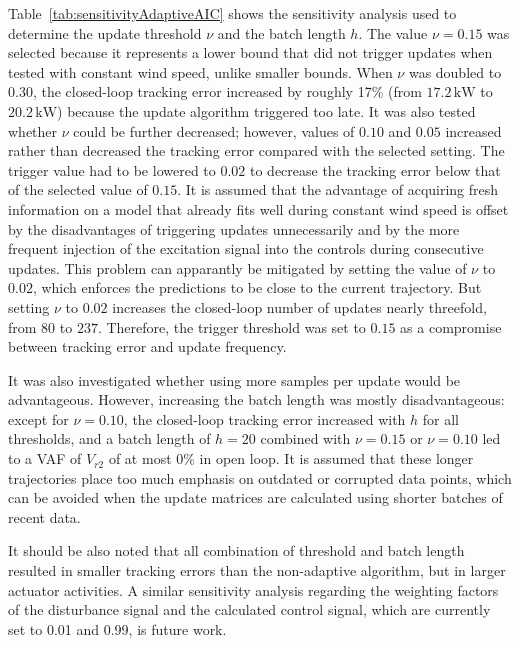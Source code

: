 Table~\ref{tab:sensitivityAdaptiveAIC} shows the sensitivity analysis used to determine the update threshold $\nu$ and the batch length $h$. The value $\nu = 0.15$ was selected because it represents a lower bound that did not trigger updates when tested with constant wind speed, unlike smaller bounds. When $\nu$ was doubled to $0.30$, the closed-loop tracking error increased by roughly 17\% (from $17.2\,\mathrm{kW}$ to $20.2\,\mathrm{kW}$) because the update algorithm triggered too late. It was also tested whether $\nu$ could be further decreased; however, values of $0.10$ and $0.05$ increased rather than decreased the tracking error compared with the selected setting. The trigger value had to be lowered to $0.02$ to decrease the tracking error below that of the selected value of $0.15$. It is assumed that the advantage of acquiring fresh information on a model that already fits well during constant wind speed is offset by the disadvantages of triggering updates unnecessarily and by the more frequent injection of the excitation signal into the controls during consecutive updates. This problem can apparantly be mitigated by setting the value of $\nu$ to $0.02$, which enforces the predictions to be close to the current trajectory. But setting $\nu$ to $0.02$ increases the closed-loop number of updates nearly threefold, from $80$ to $237$. Therefore, the trigger threshold was set to $0.15$ as a compromise between tracking error and update frequency.

It was also investigated whether using more samples per update would be advantageous. However, increasing the batch length was mostly disadvantageous: except for $\nu = 0.10$, the closed-loop tracking error increased with $h$ for all thresholds, and a batch length of $h = 20$ combined with $\nu = 0.15$ or $\nu = 0.10$ led to a VAF of $V_{r2}$ of at most 0\% in open loop. It is assumed that these longer trajectories place too much emphasis on outdated or corrupted data points, which can be avoided when the update matrices are calculated using shorter batches of recent data. 

It should be also noted that all combination of threshold and batch length resulted in smaller tracking errors than the non-adaptive algorithm, but in larger actuator activities. A similar sensitivity analysis regarding the weighting factors of the disturbance signal and the calculated control signal, which are currently set to 0.01 and 0.99, is future work.

